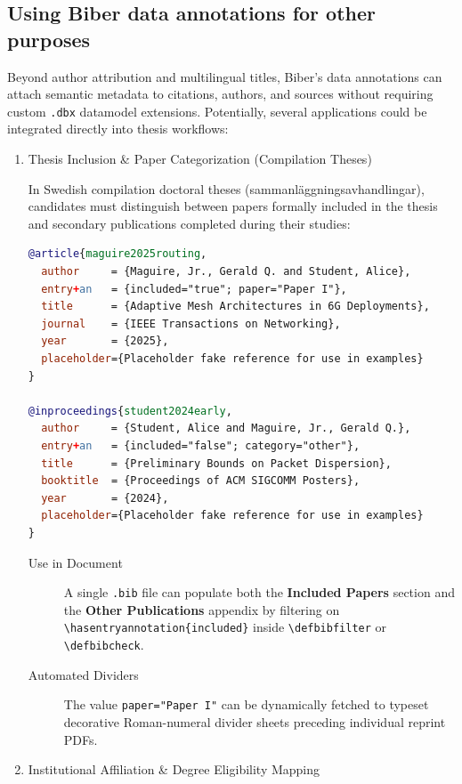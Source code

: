 \documentclass[12pt, twoside]{article}
\newcommand{\fname}[1]{\texttt{#1}}
\begin{document}
\subsection{Using Biber data annotations for other purposes}
\label{sec:otherUsesForBiberDataAnotations}

Beyond author attribution and multilingual titles, Biber’s data annotations can attach semantic metadata to citations, authors, and sources without requiring custom \texttt{.dbx} datamodel extensions. Potentially, several applications could be integrated directly into thesis workflows:
\begin{enumerate}
    \item Thesis Inclusion \& Paper Categorization (Compilation Theses)

In Swedish compilation doctoral theses (\foreignlanguage{swedish}{sammanläggningsavhandlingar}), candidates must distinguish between papers formally included in the thesis and secondary publications completed during their studies:

\begin{lstlisting}[language={BibTeX}, breaklines=true, basicstyle=\small\ttfamily,  escapechar=|, caption={{Storing thesis related metadata}}, label=lst:biberThesisMetadata]
@article{maguire2025routing,
  author     = {Maguire, Jr., Gerald Q. and Student, Alice},
  entry+an   = {included="true"; paper="Paper I"},
  title      = {Adaptive Mesh Architectures in 6G Deployments},
  journal    = {IEEE Transactions on Networking},
  year       = {2025},
  placeholder={Placeholder fake reference for use in examples}
}

@inproceedings{student2024early,
  author     = {Student, Alice and Maguire, Jr., Gerald Q.},
  entry+an   = {included="false"; category="other"},
  title      = {Preliminary Bounds on Packet Dispersion},
  booktitle  = {Proceedings of ACM SIGCOMM Posters},
  year       = {2024},
  placeholder={Placeholder fake reference for use in examples}
}
\end{lstlisting}
\begin{description}
    \item[Use in Document] A single \fname{.bib} file can populate both the \textbf{Included Papers} section and the \textbf{Other Publications} appendix by filtering on  \texttt{\textbackslash hasentryannotation\{included\}} inside \texttt{\textbackslash defbibfilter} or \texttt{\textbackslash defbibcheck}.
    \item[Automated Dividers] The value \texttt{paper="Paper I"} can be dynamically fetched to typeset decorative Roman-numeral divider sheets preceding individual reprint \glspl{PDF}.
\end{description}
    \item Institutional Affiliation \& Degree Eligibility Mapping


\end{enumerate}
\end{document}
